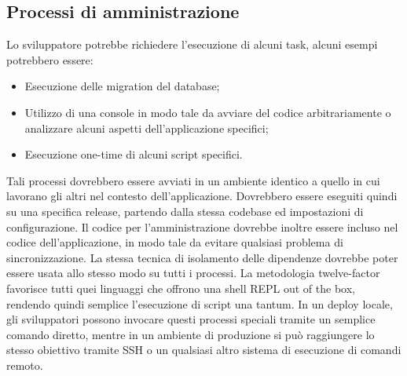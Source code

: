 \documentclass[PianoDiQualifica.tex]{subfiles}
\begin{document}
\subsection{Processi di amministrazione}
Lo sviluppatore potrebbe richiedere l'esecuzione di alcuni task, alcuni esempi potrebbero essere:
\begin{itemize}
\item Esecuzione delle migration del database;
\item Utilizzo di una console in modo tale da avviare del codice arbitrariamente o analizzare alcuni aspetti dell'applicazione specifici;
\item Esecuzione one-time di alcuni script specifici.
\end{itemize}
Tali processi dovrebbero essere avviati in un ambiente identico a quello in cui lavorano gli altri nel contesto dell'applicazione. Dovrebbero essere eseguiti quindi su una specifica release, partendo dalla stessa codebase ed impostazioni di configurazione. Il codice per l'amministrazione dovrebbe inoltre essere incluso nel codice dell'applicazione, in modo tale da evitare qualsiasi problema di sincronizzazione.
La stessa tecnica di isolamento delle dipendenze dovrebbe poter essere usata allo stesso modo su tutti i processi.
La metodologia twelve-factor favorisce tutti quei linguaggi che offrono una shell REPL out of the box, rendendo quindi semplice l'esecuzione di script una tantum. In un deploy locale, gli sviluppatori possono invocare questi processi speciali tramite un semplice comando diretto, mentre in un ambiente di produzione si può raggiungere lo stesso obiettivo tramite SSH o un qualsiasi altro sistema di esecuzione di comandi remoto.
\end{document}

